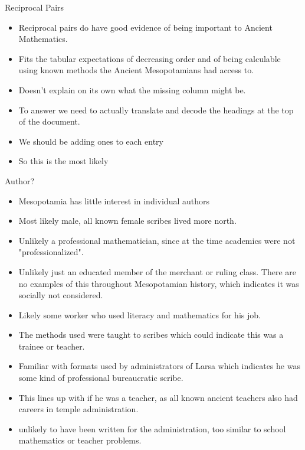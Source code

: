 \documentclass{report}
\begin{document}
{\large Reciprocal Pairs}
\begin{itemize}
    \item Reciprocal pairs do have good evidence of being
        important to Ancient Mathematics.
    \item Fits the tabular expectations of decreasing order
        and of being calculable using known methods
        the Ancient Mesopotamians had access to.
    \item Doesn't explain on its own what the missing
        column might be.
    \item To answer we need to actually translate and
        decode the headings at the top of the document.
    \item We should be adding ones to each entry
    \item So this is the most likely
\end{itemize}

{\large Author?}
\begin{itemize}
    \item Mesopotamia has little interest in individual
        authors
    \item Most likely male, all known female scribes lived
        more north.
    \item Unlikely a professional mathematician, since at
        the time academics were not "professionalized".
    \item Unlikely just an educated member of the
        merchant or ruling class. There are no examples of
        this throughout Mesopotamian history, which indicates
        it was socially not considered.
    \item Likely some worker who used literacy and mathematics
        for his job.
    \item The methods used were taught to scribes which could
        indicate this was a trainee or teacher.
    \item Familiar with formats used by administrators of
        Larsa which indicates he was some kind of professional
        bureaucratic scribe.
    \item This lines up with if he was a teacher, as all known
        ancient teachers also had careers in temple
        administration.
    \item unlikely to have been written for the administration,
        too similar to school mathematics or teacher problems.
\end{itemize}
\end{document}
